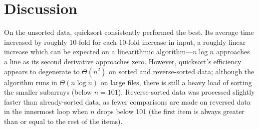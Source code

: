 \documentclass{article}
\begin{document}
\begin{table}[H]
  \begin{center}
    \caption{Results Summary (values in milliseconds)}
    \label{summary}
  \end{center}
\end{table}

\section{Discussion}

On the unsorted data, quicksort consistently performed the best.  Its average time increased by roughly 10-fold for each 10-fold increase in input, a roughly linear increase which can be expected on a linearithmic algorithm---$n\log n$ approaches a line as its second derivative approaches zero.  However, quicksort's efficiency appears to degenerate to $\Theta(n^2)$ on sorted and reverse-sorted data; although the algorithm runs in $\Theta(n \log n)$ on large files, there is still a heavy load of sorting the smaller subarrays (below $n=101$).  Reverse-sorted data was processed slightly faster than already-sorted data, as fewer comparisons are made on reversed data in the innermost loop when $n$ drops below 101 (the first item is always greater than or equal to the rest of the items).  
\end{document}
